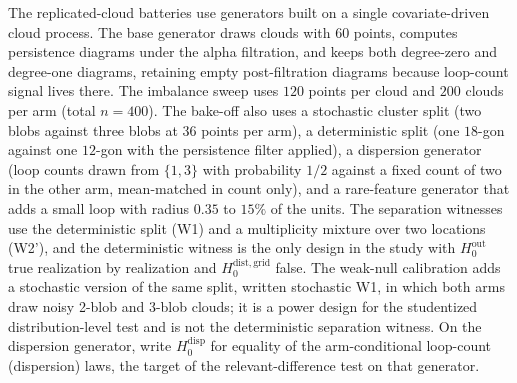 The replicated-cloud batteries use generators built on a single covariate-driven cloud process. The base generator draws clouds with $60$ points, computes persistence diagrams under the alpha filtration, and keeps both degree-zero and degree-one diagrams, retaining empty post-filtration diagrams because loop-count signal lives there. The imbalance sweep uses $120$ points per cloud and $200$ clouds per arm (total $n=400$). The bake-off also uses a stochastic cluster split (two blobs against three blobs at $36$ points per arm), a deterministic split (one $18$-gon against one $12$-gon with the persistence filter applied), a dispersion generator (loop counts drawn from $\{1,3\}$ with probability $1/2$ against a fixed count of two in the other arm, mean-matched in count only), and a rare-feature generator that adds a small loop with radius $0.35$ to $15\%$ of the units. The separation witnesses use the deterministic split (W1) and a multiplicity mixture over two locations (W2'), and the deterministic witness is the only design in the study with $H_0^{\mathrm{out}}$ true realization by realization and $H_0^{\mathrm{dist,grid}}$ false. The weak-null calibration adds a stochastic version of the same split, written stochastic W1, in which both arms draw noisy 2-blob and 3-blob clouds; it is a power design for the studentized distribution-level test and is not the deterministic separation witness. On the dispersion generator, write $H_0^{\mathrm{disp}}$ for equality of the arm-conditional loop-count (dispersion) laws, the target of the relevant-difference test on that generator.

